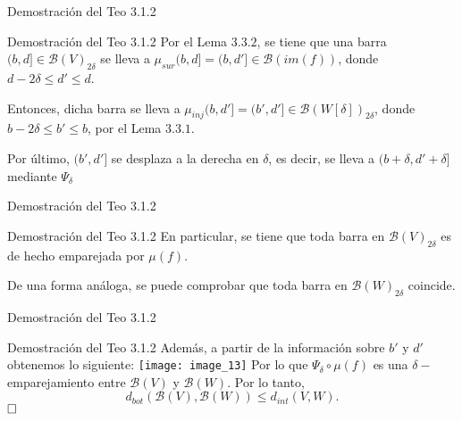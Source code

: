 \documentclass{beamer}
\begin{document}
\begin{frame}{Demostración del Teo 3.1.2}
    \begin{block}{Demostración del Teo 3.1.2}
        Por el Lema $3.3.2$, se tiene que una barra $(b, d] \in \mathcal{B}(V)_{2\delta}$ se lleva a $\mu_{sur}(b, d]=(b, d']\in \mathcal{B}(im (f))$, donde $d - 2\delta \leq d' \leq d$. 
        \newline
        \pause
        
        Entonces, dicha barra se lleva a $\mu_{inj} (b, d'] = (b',d'] \in \mathcal{B}(W[\delta])_{2\delta}$, donde $b - 2\delta \leq b' \leq b$, por el Lema $3.3.1$. 
        \newline 
        \pause
        
        Por último, $(b', d']$ se desplaza a la derecha en $\delta$, es decir, se lleva a $(b + \delta, d' + \delta]$ mediante $\Psi_{\delta}$
    \end{block}
\end{frame}

\begin{frame}{Demostración del Teo 3.1.2}
    \begin{block}{Demostración del Teo 3.1.2}
        En particular, se tiene que toda barra en $\mathcal{B}(V)_{2\delta}$ 
        es de hecho emparejada por $\mu(f)$.
        \newline
        \pause
        
        De una forma análoga, se puede comprobar que toda barra en $\mathcal{B}(W)_{2\delta}$ coincide.
    \end{block}
\end{frame}


\begin{frame}{Demostración del Teo 3.1.2}
    \begin{block}{Demostración del Teo 3.1.2}
        Además, a partir de la información sobre $b'$ y $d'$ obtenemos lo siguiente:
        \newline
        \pause
        \texttt{[image: image\_13]}
        \pause
        Por lo que $\Psi_{\delta}\circ\mu(f)$ es una $\delta-$emparejamiento entre $\mathcal{B}(V)$ y $\mathcal{B}(W)$. Por lo tanto, 
        \newline 
        \pause
        $$d_{bot}(\mathcal{B}(V), \mathcal{B}(W)) \leq d_{int}(V, W ).$$
        $\hfill\square$
    \end{block}
\end{frame}
\end{document}
